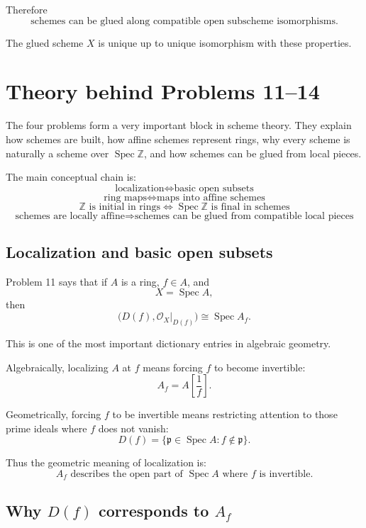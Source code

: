 \documentclass[12pt,a4paper]{article}
\newcommand{\ZZ}{\mathbb Z}
\newcommand{\OO}{\mathcal{O}}
\newcommand{\Spec}{\operatorname{Spec}}
\theoremstyle{notespace}
\begin{document}
Therefore
\[
\boxed{
	\text{schemes can be glued along compatible open subscheme isomorphisms.}
}
\]

The glued scheme \(X\) is unique up to unique isomorphism with these properties.

\section{Theory behind Problems 11--14}

The four problems form a very important block in scheme theory. They explain how schemes are built, how affine schemes represent rings, why every scheme is naturally a scheme over \(\Spec\ZZ\), and how schemes can be glued from local pieces.

The main conceptual chain is:
\[
\boxed{
	\text{localization}
	\Longleftrightarrow
	\text{basic open subsets}
}
\]
\[
\boxed{
	\text{ring maps}
	\Longleftrightarrow
	\text{maps into affine schemes}
}
\]
\[
\boxed{
	\ZZ \text{ is initial in rings}
	\Longleftrightarrow
	\Spec\ZZ \text{ is final in schemes}
}
\]
\[
\boxed{
	\text{schemes are locally affine}
	\Longrightarrow
	\text{schemes can be glued from compatible local pieces}
}
\]

\subsection{Localization and basic open subsets}

Problem 11 says that if \(A\) is a ring, \(f\in A\), and
\[
X=\Spec A,
\]
then
\[
\bigl(D(f),\OO_X|_{D(f)}\bigr)\cong \Spec A_f.
\]

This is one of the most important dictionary entries in algebraic geometry.

Algebraically, localizing \(A\) at \(f\) means forcing \(f\) to become invertible:
\[
A_f=A\left[\frac1f\right].
\]

Geometrically, forcing \(f\) to be invertible means restricting attention to those prime ideals where \(f\) does not vanish:
\[
D(f)=\{\mathfrak p\in \Spec A:f\notin \mathfrak p\}.
\]

Thus the geometric meaning of localization is:
\[
\boxed{
	A_f \text{ describes the open part of } \Spec A
	\text{ where } f \text{ is invertible.}
}
\]

\subsection{Why \(D(f)\) corresponds to \(A_f\)}
\end{document}
